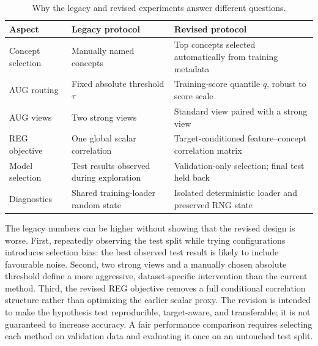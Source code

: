 \documentclass[11pt,a4paper]{article}
\begin{document}
\begin{table}[ht]
\centering
\small
\caption{Why the legacy and revised experiments answer different questions.}
\label{tab:legacy_protocol}
\begin{tabularx}{\textwidth}{lXX}
\toprule
Aspect & Legacy protocol & Revised protocol \\
\midrule
Concept selection & Manually named concepts & Top concepts selected automatically from training metadata \\
AUG routing & Fixed absolute threshold $\tau$ & Training-score quantile $q$, robust to score scale \\
AUG views & Two strong views & Standard view paired with a strong view \\
REG objective & One global scalar correlation & Target-conditioned feature--concept correlation matrix \\
Model selection & Test results observed during exploration & Validation-only selection; final test held back \\
Diagnostics & Shared training-loader random state & Isolated deterministic loader and preserved RNG state \\
\bottomrule
\end{tabularx}
\end{table}

The legacy numbers can be higher without showing that the revised design is
worse. First, repeatedly observing the test split while trying configurations
introduces selection bias: the best observed test result is likely to include
favourable noise. Second, two strong views and a manually chosen absolute
threshold define a more aggressive, dataset-specific intervention than the
current method. Third, the revised REG objective removes a full conditional
correlation structure rather than optimizing the earlier scalar proxy. The
revision is intended to make the hypothesis test reproducible, target-aware,
and transferable; it is not guaranteed to increase accuracy. A fair performance
comparison requires selecting each method on validation data and evaluating it
once on an untouched test split.
\end{document}
